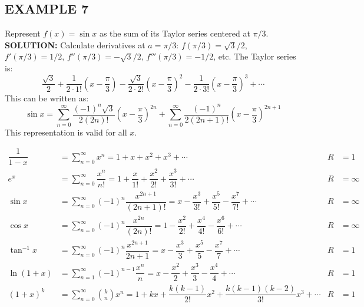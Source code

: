 \documentclass{article}
\theoremstyle{mystyle}
\begin{document}
\subsection*{EXAMPLE 7}
Represent \(f(x) = \sin x\) as the sum of its Taylor series centered at \(\pi/3\).\\
\textbf{SOLUTION:}
Calculate derivatives at \(a=\pi/3\): \(f(\pi/3)=\sqrt{3}/2\), \(f'(\pi/3)=1/2\), \(f''(\pi/3)=-\sqrt{3}/2\), \(f'''(\pi/3)=-1/2\), etc. The Taylor series is:
\[ \dfrac{\sqrt{3}}{2} + \dfrac{1}{2 \cdot 1!}\left(x-\dfrac{\pi}{3}\right) - \dfrac{\sqrt{3}}{2 \cdot 2!}\left(x-\dfrac{\pi}{3}\right)^2 - \dfrac{1}{2 \cdot 3!}\left(x-\dfrac{\pi}{3}\right)^3 + \cdots \]
This can be written as:
\[ \sin x = \sum_{n=0}^{\infty} \dfrac{(-1)^n \sqrt{3}}{2(2n)!} \left(x-\dfrac{\pi}{3}\right)^{2n} + \sum_{n=0}^{\infty} \dfrac{(-1)^n}{2(2n+1)!} \left(x-\dfrac{\pi}{3}\right)^{2n+1} \]
This representation is valid for all \(x\).

\begin{tcolorbox}[
    colback=white,
    colframe=orange!80!white,
    title=Theorem 5,
    boxrule=0.5mm,
    arc=3mm
    ]
\begin{align*}
    \dfrac{1}{1-x} &= \sum_{n=0}^{\infty} x^n = 1 + x + x^2 + x^3 + \cdots & R &= 1 \\[.5em] %
    e^x &= \sum_{n=0}^{\infty} \dfrac{x^n}{n!} = 1 + \dfrac{x}{1!} + \dfrac{x^2}{2!} + \dfrac{x^3}{3!} + \cdots & R &= \infty \\[.5em]
    \sin x &= \sum_{n=0}^{\infty} (-1)^n \dfrac{x^{2n+1}}{(2n+1)!} = x - \dfrac{x^3}{3!} + \dfrac{x^5}{5!} - \dfrac{x^7}{7!} + \cdots & R &= \infty \\[.5em]
    \cos x &= \sum_{n=0}^{\infty} (-1)^n \dfrac{x^{2n}}{(2n)!} = 1 - \dfrac{x^2}{2!} + \dfrac{x^4}{4!} - \dfrac{x^6}{6!} + \cdots & R &= \infty \\[.5em]
    \tan^{-1} x &= \sum_{n=0}^{\infty} (-1)^n \dfrac{x^{2n+1}}{2n+1} = x - \dfrac{x^3}{3} + \dfrac{x^5}{5} - \dfrac{x^7}{7} + \cdots & R &= 1 \\[.5em]
    \ln(1+x) &= \sum_{n=1}^{\infty} (-1)^{n-1} \dfrac{x^n}{n} = x - \dfrac{x^2}{2} + \dfrac{x^3}{3} - \dfrac{x^4}{4} + \cdots & R &= 1 \\[.5em]
    (1+x)^k &= \sum_{n=0}^{\infty} \binom{k}{n} x^n = 1 + kx + \dfrac{k(k-1)}{2!}x^2 + \dfrac{k(k-1)(k-2)}{3!}x^3 + \cdots & R &= 1
\end{align*}
\end{tcolorbox}
\end{document}
